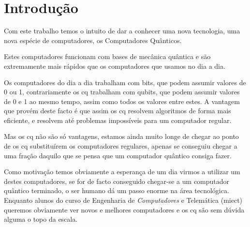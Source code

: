 \documentclass{report}
\begin{document}
\clearpage
\null



\chapter{Introdução}
\label{chap.introducao}

	Com este trabalho temos o intuito de dar a conhecer uma nova tecnologia, uma nova espécie de computadores, os Computadores Quânticos.


	Estes computadores funcionam com bases de mecânica quântica e são extremamente mais rápidos que os computadores que usamos no dia a dia.


	Os computadores do dia a dia trabalham com bits, que podem assumir valores de 0 ou 1, contrariamente os \ac{cq} trabalham com qubits, que podem assumir valores de 0 e 1 ao mesmo tempo, assim como todos os valores entre estes. A vantagem que provém deste facto é que assim os \ac{cq} resolvem algoritmos de forma mais eficiente, e resolvem até problemas impossíveis para um computador regular.


	Mas os \ac{cq} não são só vantagens, estamos ainda muito longe de chegar ao ponto de os \ac{cq} substituírem os computadores regulares, apenas se conseguiu chegar a uma fração daquilo que se pensa que um computador quântico consiga fazer.

	Como motivação temos obviamente a esperança de um dia virmos a utilizar um destes computadores, se for de facto conseguido chegar-se a um computador quântico terminado, o ser humano dá um passo enorme na área tecnológica. Enquanto alunos do curso de Engenharia de \emph{Computadores} e Telemática (\ac{miect}) queremos obviamente ver novos e melhores computadores e os \ac{cq} são sem dúvida alguma o topo da escala.
\end{document}

